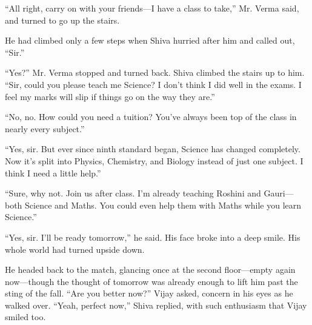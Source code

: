 ``All right, carry on with your friends—I have a class to take,'' Mr. Verma said, and turned to go up the stairs.

He had climbed only a few steps when Shiva hurried after him and called out, ``Sir.''

``Yes?'' Mr. Verma stopped and turned back. Shiva climbed the stairs up to him. ``Sir, could you please teach me Science? I don't think I did well in the exams. I feel my marks will slip if things go on the way they are.''

``No, no. How could you need a tuition? You've always been top of the class in nearly every subject.''

``Yes, sir. But ever since ninth standard began, Science has changed completely. Now it's split into Physics, Chemistry, and Biology instead of just one subject. I think I need a little help.''

``Sure, why not. Join us after class. I'm already teaching Roshini and Gauri—both Science and Maths. You could even help them with Maths while you learn Science.''

``Yes, sir. I'll be ready tomorrow,'' he said. His face broke into a deep smile. His whole world had turned upside down.

He headed back to the match, glancing once at the second floor—empty again now—though the thought of tomorrow was already enough to lift him past the sting of the fall. ``Are you better now?'' Vijay asked, concern in his eyes as he walked over. ``Yeah, perfect now,'' Shiva replied, with such enthusiasm that Vijay smiled too. 